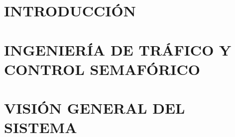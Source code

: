 \documentclass[12pt, oneside]{book}
\begin{document}
\frontmatter



\newpage
\thispagestyle{empty}
\null
\clearpage 
	
\newpage
\setcounter{page}{1}


\newpage




%

\newpage


\newpage


\newpage


\newpage



\newpage
\tableofcontents

\newpage
\listoffigures
 
\newpage
\listoftables

\newpage



\mainmatter
\chapterformatdefault

\chapter{INTRODUCCIÓN}
\thispagestyle{empty}


\chapter{INGENIERÍA DE TRÁFICO Y CONTROL SEMAFÓRICO}
\thispagestyle{empty}


\chapter{VISIÓN GENERAL DEL SISTEMA}
\thispagestyle{empty}

\end{document}
